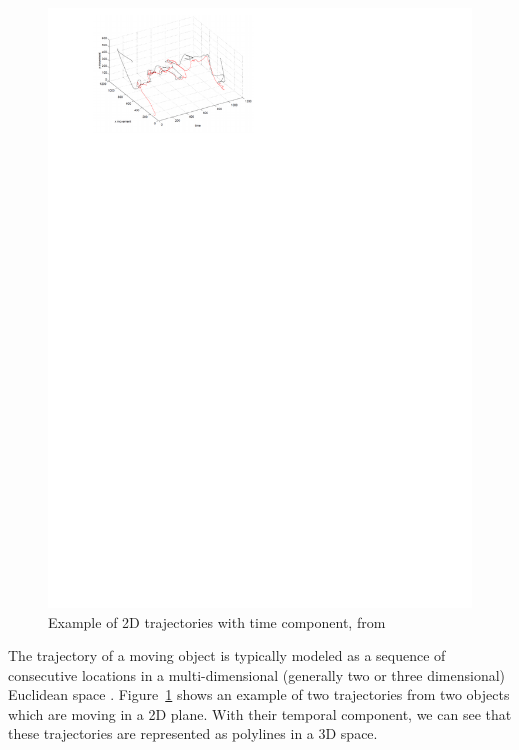 \begin{figure}
\centering
\includegraphics[scale=1]{Gambar/2d_trj}
\caption[Example of 2D trajectories with time component, from \cite{Vlachos:2002}]{Example of 2D trajectories with time component, from \cite{Vlachos:2002}} 
\label{fig:2d_trj}
\end{figure}

The trajectory of a moving object is typically modeled as a sequence of consecutive locations in a multi-dimensional (generally two or three dimensional) Euclidean space \cite{Vlachos:2002}.
Figure~\ref{fig:2d_trj} shows an example of two trajectories from two objects which are moving in a 2D plane.
With their temporal component, we can see that these trajectories are represented as polylines in a 3D space.
 
